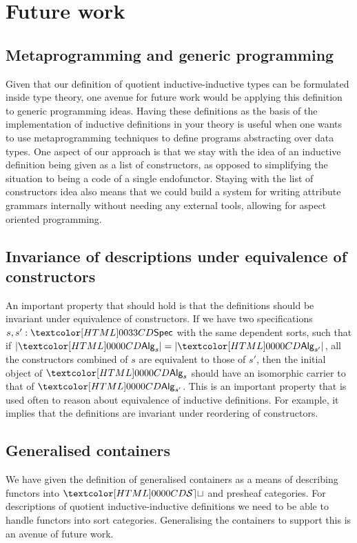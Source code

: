 \section{Future work}

\subsection{Metaprogramming and generic programming}

Given that our definition of quotient inductive-inductive types can be
formulated inside type theory, one avenue for future work would be
applying this definition to generic programming ideas. Having these
definitions as the basis of the implementation of inductive
definitions in your theory is useful when one wants to use
metaprogramming techniques to define programs abstracting over data
types. One aspect of our approach is that we stay with the idea of an
inductive definition being given as a list of constructors, as opposed
to simplifying the situation to being a code of a single
endofunctor. Staying with the list of constructors idea also means
that we could build a system for writing attribute grammars internally
without needing any external tools, allowing for aspect oriented
programming.

\subsection{Invariance of descriptions under equivalence of constructors}

An important property that should hold is that the definitions should
be invariant under equivalence of constructors. If we have two
specifications $s, s' : \specty$ with the same dependent sorts, such
that if $| \Alg_s | = | \Alg_{s'} |$, \ie all the constructors
combined of $s$ are equivalent to those of $s'$, then the initial
object of $\Alg_s$ should have an isomorphic carrier to that of
$\Alg_{s'}$. This is an important property that is used often to
reason about equivalence of inductive definitions. For example, it
implies that the definitions are invariant under reordering of
constructors.

\subsection{Generalised containers}

We have given the definition of generalised containers as a means of
describing functors into $\SET$ and presheaf categories. For
descriptions of quotient inductive-inductive definitions we need to be
able to handle functors into sort categories. Generalising the
containers to support this is an avenue of future work.

